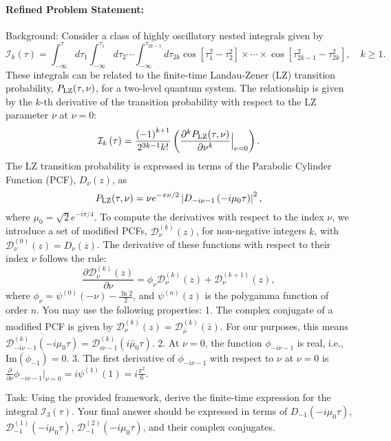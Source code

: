 \documentclass[10pt]{article}
\begin{document}
\paragraph*{Refined Problem Statement:}
Background:
Consider a class of highly oscillatory nested integrals given by
$$ \mathcal{I}_{k}(\tau)=\int^\tau_{-\infty}d\tau_{1}\int^{\tau_{1}}_{-\infty}d\tau_{2} \cdots\int^{\tau_{2k-1}}_{-\infty}d\tau_{2k}\cos[\tau^{2}_{1}-\tau^{2}_{2}]\times\cdots\times\cos[ \tau^{2}_{2k-1}-\tau^{2}_{2k}], \quad k\ge 1. $$
These integrals can be related to the finite-time Landau-Zener (LZ) transition probability, $P_{\rm LZ}(\tau,\nu)$, for a two-level quantum system. The relationship is given by the $k$-th derivative of the transition probability with respect to the LZ parameter $\nu$ at $\nu=0$:
$$ \mathcal{I}_{k}\left(\tau\right)=\frac{\left(-1\right)^{k+1}}{2^{3k-1}k!}\left(\frac{\partial^{k}P_{\rm LZ}(\tau,\nu)}{\partial \nu^{k}}\Big|_{\nu=0}\right). $$
The LZ transition probability is expressed in terms of the Parabolic Cylinder Function (PCF), $D_{\nu}(z)$, as
$$ P_{\rm LZ}(\tau,\nu)=\nu e^{-\pi\nu/2}\left|D_{-i\nu-1}\left(-i\mu_0\tau\right)\right|^{2}, $$
where $\mu_0=\sqrt{2}e^{-i\pi/4}$. To compute the derivatives with respect to the index $\nu$, we introduce a set of modified PCFs, $\mathcal{D}^{\left(k\right)}_{\nu}\left(z\right)$, for non-negative integers $k$, with $\mathcal{D}^{\left(0\right)}_{\nu}\left(z\right) = D_{\nu}\left(z\right)$. The derivative of these functions with respect to their index $\nu$ follows the rule:
$$ \frac{\partial \mathcal{D}^{\left(k\right)}_{\nu}\left(z\right)}{\partial \nu}=\phi_{\nu}\mathcal{D}^{\left(k\right)}_{\nu}\left(z\right)+\mathcal{D}^{\left(k+1\right)}_{\nu}\left(z\right), $$
where $\phi_{\nu}=\psi^{\left(0\right)}\left(-\nu\right)-\frac{\ln 2}{2}$, and $\psi^{(n)}(z)$ is the polygamma function of order $n$. You may use the following properties:
1. The complex conjugate of a modified PCF is given by $\overline{\mathcal{D}^{(k)}_{\nu}(z)} = \mathcal{D}^{(k)}_{\bar{\nu}}(\bar{z})$. For our purposes, this means $\overline{\mathcal{D}^{(k)}_{-i\nu-1}(-i\mu_0\tau)} = \mathcal{D}^{(k)}_{i\nu-1}(i\bar{\mu}_0\tau)$.
2. At $\nu=0$, the function $\phi_{-i\nu-1}$ is real, i.e., $\mathrm{Im}(\phi_{-1})=0$.
3. The first derivative of $\phi_{-i\nu-1}$ with respect to $\nu$ at $\nu=0$ is $\frac{\partial}{\partial\nu}\phi_{-i\nu-1}\Big|_{\nu=0} = i\psi^{(1)}(1) = i\frac{\pi^2}{6}$.

Task:
Using the provided framework, derive the finite-time expression for the integral $\mathcal{I}_3(\tau)$. Your final answer should be expressed in terms of $D_{-1}(-i\mu_0\tau)$, $\mathcal{D}^{(1)}_{-1}(-i\mu_0\tau)$, $\mathcal{D}^{(2)}_{-1}(-i\mu_0\tau)$, and their complex conjugates.
\end{document}
